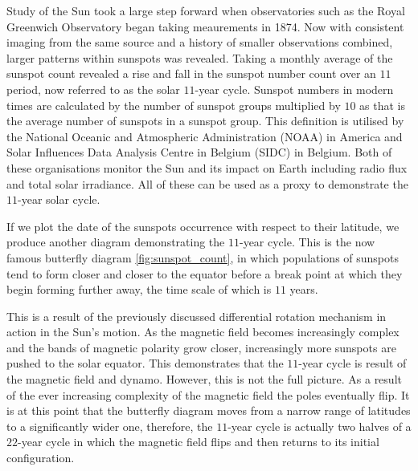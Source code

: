 Study of the Sun took a large step forward when observatories such as the Royal Greenwich Observatory began taking meaurements in 1874.
Now with consistent imaging from the same source and a history of smaller observations combined, larger patterns within sunspots was revealed.
Taking a monthly average of the sunspot count revealed a rise and fall in the sunspot number count over an $11$ period, now referred to as the solar $11$-year cycle.
Sunspot numbers in modern times are calculated by the number of sunspot groups multiplied by $10$ as that is the average number of sunspots in a sunspot group.
This definition is utilised by the National Oceanic and Atmospheric Administration (NOAA) in America and Solar Influences Data Analysis Centre in Belgium (SIDC) in Belgium.
Both of these organisations monitor the Sun and its impact on Earth including radio flux and total solar irradiance.
All of these can be used as a proxy to demonstrate the $11$-year solar cycle.

If we plot the date of the sunspots occurrence with respect to their latitude, we produce another diagram demonstrating the $11$-year cycle.
This is the now famous butterfly diagram \ref{fig:sunspot_count}, in which populations of sunspots tend to form closer and closer to the equator before a break point at which they begin forming further away, the time scale of which is $11$ years.

This is a result of the previously discussed differential rotation mechanism in action in the Sun's motion.
As the magnetic field becomes increasingly complex and the bands of magnetic polarity grow closer, increasingly more sunspots are pushed to the solar equator.
This demonstrates that the $11$-year cycle is result of the magnetic field and dynamo.
However, this is not the full picture.
As a result of the ever increasing complexity of the magnetic field the poles eventually flip.
It is at this point that the butterfly diagram moves from a narrow range of latitudes to a significantly wider one, therefore, the $11$-year cycle is actually two halves of a $22$-year cycle in which the magnetic field flips and then returns to its initial configuration.

